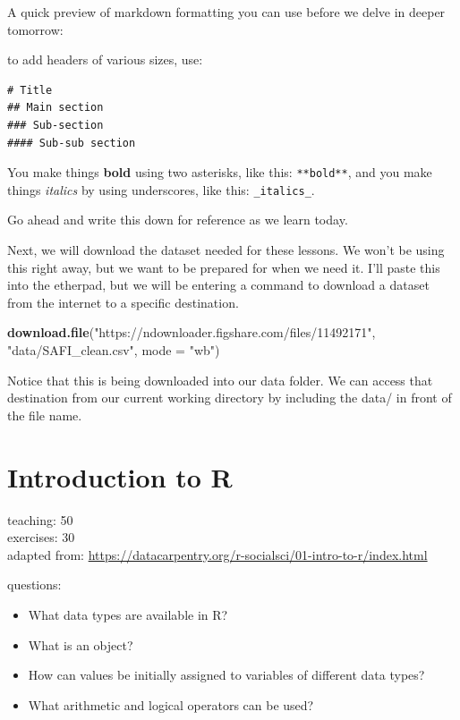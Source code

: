 \documentclass[]{book}
\newenvironment{Shaded}{\begin{snugshade}}{\end{snugshade}}
\newcommand{\KeywordTok}[1]{\textcolor[rgb]{0.13,0.29,0.53}{\textbf{#1}}}
\newcommand{\DataTypeTok}[1]{\textcolor[rgb]{0.13,0.29,0.53}{#1}}
\newcommand{\StringTok}[1]{\textcolor[rgb]{0.31,0.60,0.02}{#1}}
\newcommand{\NormalTok}[1]{#1}
\providecommand{\tightlist}{%
  \setlength{\itemsep}{0pt}\setlength{\parskip}{0pt}}
\begin{document}
A quick preview of markdown formatting you can use before we delve in
deeper tomorrow:

to add headers of various sizes, use:

\begin{verbatim}
# Title
## Main section
### Sub-section
#### Sub-sub section
\end{verbatim}

You make things \textbf{bold} using two asterisks, like this:
\texttt{**bold**}, and you make things \emph{italics} by using
underscores, like this: \texttt{\_italics\_}.

Go ahead and write this down for reference as we learn today.

Next, we will download the dataset needed for these lessons. We won't be
using this right away, but we want to be prepared for when we need it.
I'll paste this into the etherpad, but we will be entering a command to
download a dataset from the internet to a specific destination.

\begin{Shaded}
\begin{Highlighting}[]
\KeywordTok{download.file}\NormalTok{(}\StringTok{"https://ndownloader.figshare.com/files/11492171"}\NormalTok{,}
              \StringTok{"data/SAFI_clean.csv"}\NormalTok{, }\DataTypeTok{mode =} \StringTok{"wb"}\NormalTok{)}
\end{Highlighting}
\end{Shaded}

Notice that this is being downloaded into our data folder. We can access
that destination from our current working directory by including the
data/ in front of the file name.

\chapter{Introduction to R}\label{basicR}

teaching: 50\\
exercises: 30\\
adapted from:
\url{https://datacarpentry.org/r-socialsci/01-intro-to-r/index.html}

questions:

\begin{itemize}
\tightlist
\item
  What data types are available in R?\\
\item
  What is an object?\\
\item
  How can values be initially assigned to variables of different data
  types?\\
\item
  What arithmetic and logical operators can be used?
\end{itemize}
\end{document}
